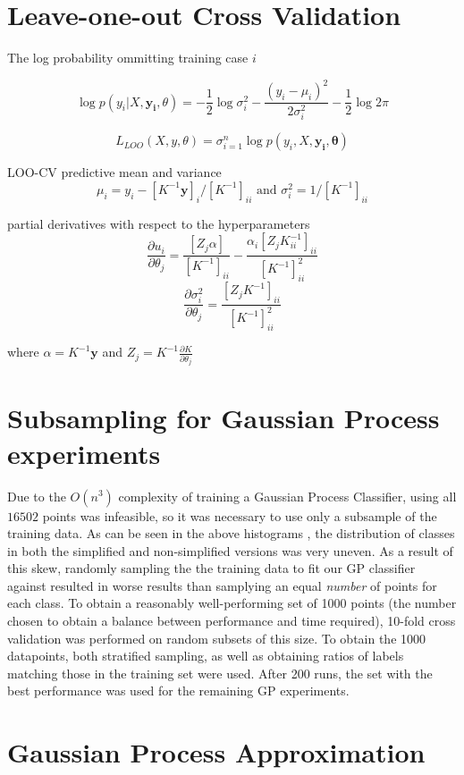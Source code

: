 \section{Leave-one-out Cross Validation}

The log probability ommitting training case $i$

$$\log p(y_i|X, \mathbf{y_i}, \theta) = -\frac{1}{2}\log\sigma^2_i - \frac{(y_i - \mu_i)^2}{2 \sigma^2_i} - \frac{1}{2}\log2\pi$$

$$ L_{LOO}(X, y, \theta) = \sigma^n_{i=1} \log p(y_i, X, \mathbf{y_i}, \mathbf{\theta})$$

LOO-CV predictive mean and variance
$$\mu_i= y_i - [K^{-1}\mathbf{y}]_i / [K^{-1}]_{ii} \text{ and } \sigma_i^2 = 1/[K^{-1}]_{ii}$$

partial derivatives with respect to the hyperparameters
$$\frac{\partial{u_i}}{\partial{\theta_j}} = \frac{[Z_j \alpha]}{[K^{-1}]_{ii}} - \frac{\alpha_i[Z_j K^{-1}_{ii}]_{ii}}{[K^{-1}]^2_{ii}}$$
$$\frac{\partial{\sigma_i^2}}{\partial{\theta_j}} = \frac{[Z_jK^{-1}]_{ii}}{[K^{-1}]^2_{ii}}$$

where $\alpha = K^{-1}\mathbf{y}$ and $Z_j = K^{-1} \frac{\partial{K}}{\partial{\theta_j}}$

\section{Subsampling for Gaussian Process experiments}

Due to the $O(n^3)$ complexity of training a Gaussian Process Classifier, using all $16502$ points was infeasible, so it was necessary to use only a subsample of the training data. As can be seen in the above histograms , the distribution of classes in both the simplified and non-simplified versions was very uneven. As a result of this skew, randomly sampling the the training data to fit our GP classifier against resulted in worse results than samplying an equal \textit{number} of points for each class. To obtain a reasonably well-performing set of 1000 points (the number chosen to obtain a balance between performance and time required), 10-fold cross validation was performed on random subsets of this size. To obtain the 1000 datapoints, both stratified sampling, as well as obtaining ratios of labels matching those in the training set were used. After 200 runs, the set with the best performance was used for the remaining GP experiments.

\section{Gaussian Process Approximation}

